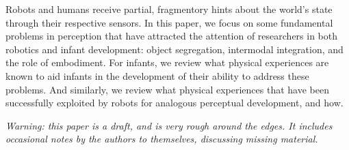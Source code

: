 
Robots and humans receive partial, fragmentory hints about the world's
state through their respective sensors.  In this paper, we focus on
some fundamental problems in perception that have attracted the
attention of researchers in both robotics and infant development:
object segregation, intermodal integration, and the role of embodiment.
For infants, we review what physical experiences are known to aid
infants in the development of their ability to address these problems.
And similarly, we review what physical experiences that have been
successfully exploited by robots for analogous perceptual development,
and how.

{\em Warning: this paper is a draft, and is very rough around the edges.
It includes occasional notes by the authors to themselves, discussing
missing material.
}
